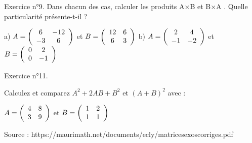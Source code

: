 \vspace{.323cm}
Exercice n°9.
Dans chacun des cas, calculer les produits A×B et B×A . Quelle particularité présente-t-il ?

a)
$ A = 
\left( \begin{array}{ c c }
 6 & -12 \\ -3 & 6
\end{array} \right)$
et
$ B = 
\left( \begin{array}{ c c }
 12 & 6 \\ 6 & 3
\end{array} \right)$
b)
$ A = 
\left( \begin{array}{ c c }
 2 & 4 \\ -1 & -2
\end{array} \right)$
et
$ B = 
\left( \begin{array}{ c c }
 0 & 2 \\ 0 & -1
\end{array} \right)$

\vspace{.323cm}
Exercice n°11.

Calculez et comparez $A^2 + 2 AB + B^2$ et $( A + B )^2$ avec : 
\begin{center}
$ A = 
\left( \begin{array}{ c c }
4 & 8 \\ 3 & 9
\end{array} \right)$
et
$ B =
\left( \begin{array}{ c c }
1 & 2 \\ 1 & 1
\end{array} \right)$
\end{center}

\vspace{.323cm}
{\footnotesize Source : https://maurimath.net/documents/ecly/matricesexoscorriges.pdf}
